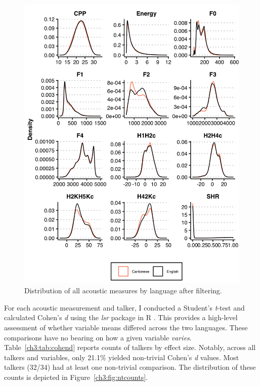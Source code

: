 \begin{figure}[htbp]
    \begin{center}
    \includegraphics[width=\linewidth]{figures/ch3_allmeasuresdensity_5in.png} 
    \caption{Distribution of all acoustic measures by language after filtering.}
    \label{ch3:fig:allmeasures}
    \end{center}
\end{figure}

For each acoustic measurement and talker, I conducted a Student's \textit{t}-test and calculated Cohen's \textit{d} using the \textit{lsr} package \citep{navarro_2015_lsr} in R \citep{r_2021}. This provides a high-level assessment of whether variable means differed across the two languages. These comparisons have no bearing on how a given variable \textit{varies}. Table~\ref{ch3:tab:cohend} reports counts of talkers by effect size. Notably, across all talkers and variables, only 21.1\% yielded non-trivial Cohen's \textit{d} values. Most talkers (32/34) had at least one non-trivial comparison. The distribution of these counts is depicted in Figure~\ref{ch3:fig:ntcounts}. 

